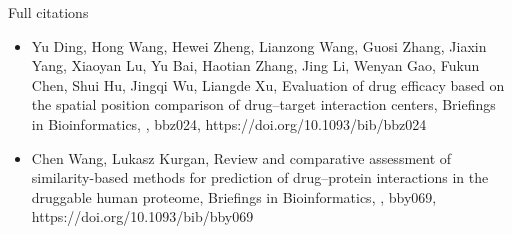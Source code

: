 \documentclass[10pt]{beamer}
\begin{document}
\begin{frame}{Full citations}
	\footnotesize
	\begin{itemize}
		\item Yu Ding, Hong Wang, Hewei Zheng, Lianzong Wang, Guosi Zhang, Jiaxin Yang, Xiaoyan Lu, Yu Bai, Haotian Zhang, Jing Li, Wenyan Gao, Fukun Chen, Shui Hu, Jingqi Wu, Liangde Xu, Evaluation of drug efficacy based on the spatial position comparison of drug–target interaction centers, Briefings in Bioinformatics, , bbz024, https://doi.org/10.1093/bib/bbz024
		\item Chen Wang, Lukasz Kurgan, Review and comparative assessment of similarity-based methods for prediction of drug–protein interactions in the druggable human proteome, Briefings in Bioinformatics, , bby069, https://doi.org/10.1093/bib/bby069
	\end{itemize}
\end{frame}
\end{document}
